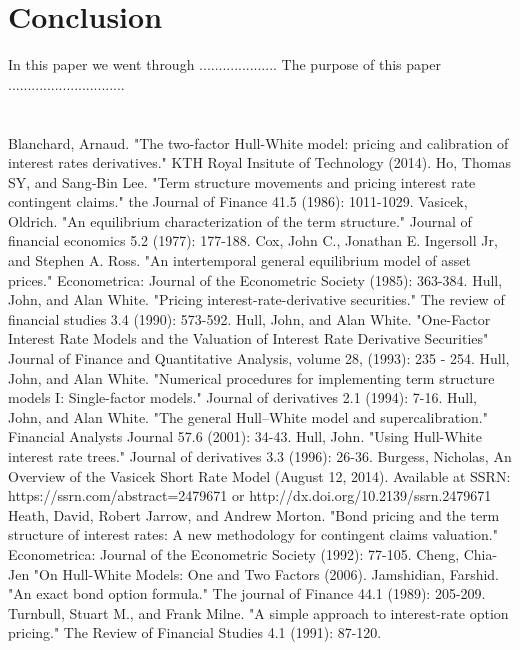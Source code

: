 \documentclass{article}
\begin{document}
\section{Conclusion}

In this paper we went through ....................  The purpose of this paper ..............................

\newpage
\section*{} \label{bibsection}


\begin{thebibliography}{MMMMM} 
 Blanchard, Arnaud. "The two-factor Hull-White model: pricing and calibration of interest rates derivatives." KTH Royal Insitute of Technology (2014).
 Ho, Thomas SY, and Sang‐Bin Lee. "Term structure movements and pricing interest rate contingent claims." the Journal of Finance 41.5 (1986): 1011-1029.
 Vasicek, Oldrich. "An equilibrium characterization of the term structure." Journal of financial economics 5.2 (1977): 177-188.
 Cox, John C., Jonathan E. Ingersoll Jr, and Stephen A. Ross. "An intertemporal general equilibrium model of asset prices." Econometrica: Journal of the Econometric Society (1985): 363-384.
 Hull, John, and Alan White. "Pricing interest-rate-derivative securities." The review of financial studies 3.4 (1990): 573-592.
 Hull, John, and Alan White. "One-Factor Interest Rate Models and the Valuation of Interest Rate Derivative Securities" Journal of Finance and Quantitative Analysis, volume 28,  (1993): 235 - 254.
 Hull, John, and Alan White. "Numerical procedures for implementing term structure models I: Single-factor models." Journal of derivatives 2.1 (1994): 7-16.
 Hull, John, and Alan White. "The general Hull–White model and supercalibration." Financial Analysts Journal 57.6 (2001): 34-43.
 Hull, John. "Using Hull-White interest rate trees." Journal of derivatives 3.3 (1996): 26-36.
 Burgess, Nicholas, An Overview of the Vasicek Short Rate Model (August 12, 2014). Available at SSRN: https://ssrn.com/abstract=2479671 or http://dx.doi.org/10.2139/ssrn.2479671
 Heath, David, Robert Jarrow, and Andrew Morton. "Bond pricing and the term structure of interest rates: A new methodology for contingent claims valuation." Econometrica: Journal of the Econometric Society (1992): 77-105.
 Cheng, Chia-Jen "On Hull-White Models: One and Two Factors (2006).
 Jamshidian, Farshid. "An exact bond option formula." The journal of Finance 44.1 (1989): 205-209.
  Turnbull, Stuart M., and Frank Milne. "A simple approach to interest-rate option pricing." The Review of Financial Studies 4.1 (1991): 87-120.

\end{thebibliography}


\end{document}

